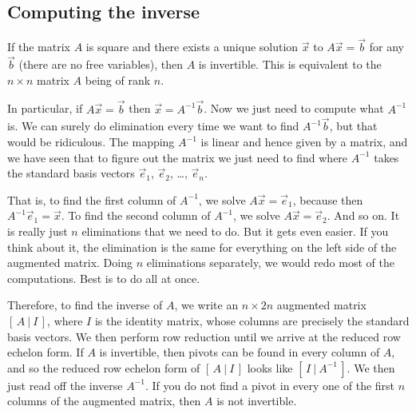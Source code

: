 \subsection{Computing the inverse}

If the matrix $A$ is square and there exists a unique solution
$\vec{x}$ to $A \vec{x} = \vec{b}$ for any $\vec{b}$ (there are no free
variables), then $A$ is invertible.
This is equivalent to the $n \times n$ matrix $A$ being of rank $n$.

In particular, if $A \vec{x} = \vec{b}$ then $\vec{x} = A^{-1} \vec{b}$.
Now we just need to compute what $A^{-1}$ is.  We can surely
do elimination every time we want to find $A^{-1} \vec{b}$, but that
would be ridiculous.  The mapping $A^{-1}$ is linear and
hence given by a matrix, and we have seen that to figure out the matrix
we just need to find where $A^{-1}$ takes the standard basis vectors
$\vec{e}_1$,
$\vec{e}_2$, \ldots,
$\vec{e}_n$.

That is, to find the first column of $A^{-1}$, we solve
$A \vec{x} = \vec{e}_1$, because then $A^{-1} \vec{e}_1 = \vec{x}$.
To find the second column of $A^{-1}$, we solve
$A \vec{x} = \vec{e}_2$.  And so on.  It is really just $n$
eliminations that we need to do.  But it gets even easier.
If you think about it, the elimination is the same for
everything on the left side of the augmented matrix.  Doing
$n$ eliminations separately, we would redo most of the computations.
Best is to do all at once.

Therefore, to find the inverse of $A$, we write an $n
\times 2n$ augmented matrix $[ \,A ~|~ I\, ]$, where $I$ is the identity
matrix, whose columns are precisely the standard basis vectors.
We then perform row reduction until we arrive at the reduced row echelon
form.  If $A$ is invertible, then pivots can be found in every column of $A$,
and so the
reduced row echelon form of $[ \,A ~|~ I\, ]$
looks like $[ \,I ~|~ A^{-1}\, ]$.
We then just read off the inverse $A^{-1}$.
If you do not find a pivot in every
one of the first $n$ columns of the augmented matrix, then
$A$ is not invertible.

